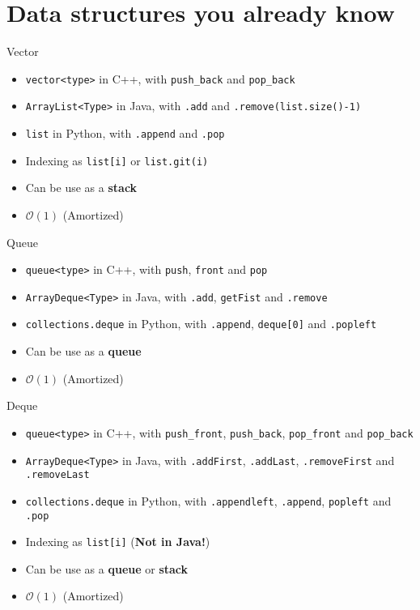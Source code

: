 \documentclass{beamer}
\begin{document}
\section{Data structures you already know}
\begin{frame}{Vector}
  \begin{itemize}
  \item \texttt{vector<type>} in C++, with \texttt{push\_back} and \texttt{pop\_back}
  \item \texttt{ArrayList<Type>} in Java, with \texttt{.add} and \texttt{.remove(list.size()-1)}
  \item \texttt{list} in Python, with \texttt{.append} and \texttt{.pop}
  \item Indexing as \texttt{list[i]} or \texttt{list.git(i)}
  \item Can be use as a \textbf{stack}
  \item $\mathcal{O}(1)$ (Amortized)
\end{itemize}
\end{frame}

\begin{frame}{Queue}
  \begin{itemize}
  \item \texttt{queue<type>} in C++, with \texttt{push}, \texttt{front} and \texttt{pop}
  \item \texttt{ArrayDeque<Type>} in Java, with \texttt{.add}, \texttt{getFist} and \texttt{.remove}
  \item \texttt{collections.deque} in Python, with \texttt{.append}, \texttt{deque[0]} and \texttt{.popleft}
  \item Can be use as a \textbf{queue}
  \item $\mathcal{O}(1)$ (Amortized)
\end{itemize}
\end{frame}

\begin{frame}{Deque}
  \begin{itemize}
  \item \texttt{queue<type>} in C++, with \texttt{push\_front}, \texttt{push\_back}, \texttt{pop\_front} and \texttt{pop\_back}
  \item \texttt{ArrayDeque<Type>} in Java, with \texttt{.addFirst}, \texttt{.addLast}, \texttt{.removeFirst} and \texttt{.removeLast}
  \item \texttt{collections.deque} in Python, with \texttt{.appendleft}, \texttt{.append}, \texttt{popleft} and \texttt{.pop}
  \item Indexing as \texttt{list[i]} (\textbf{Not in Java!})
  \item Can be use as a \textbf{queue} or \textbf{stack} 
  \item $\mathcal{O}(1)$ (Amortized)
\end{itemize}
\end{frame}
\end{document}
